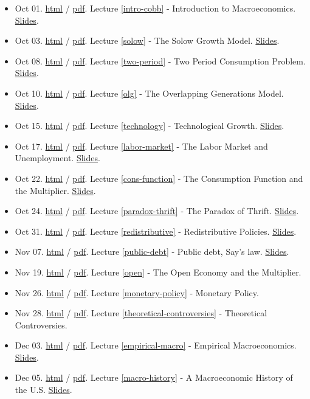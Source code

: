 \documentclass[]{book}
\providecommand{\tightlist}{%
  \setlength{\itemsep}{0pt}\setlength{\parskip}{0pt}}
\begin{document}
\begin{itemize}
\tightlist
\item
  Oct 01. \href{intro-cobb.html}{html} / \href{intro-cobb.pdf}{pdf}.
  Lecture \ref{intro-cobb} - Introduction to Macroeconomics.
  \href{slides/lecture1-slides.pdf}{Slides}.
\item
  Oct 03. \href{solow.html}{html} / \href{solow.pdf}{pdf}. Lecture
  \ref{solow} - The Solow Growth Model.
  \href{slides/lecture2-slides.pdf}{Slides}.
\item
  Oct 08. \href{two-period.html}{html} / \href{two-period.pdf}{pdf}.
  Lecture \ref{two-period} - Two Period Consumption Problem.
  \href{slides/lecture3-slides.pdf}{Slides}.
\item
  Oct 10. \href{olg.html}{html} / \href{olg.pdf}{pdf}. Lecture \ref{olg}
  - The Overlapping Generations Model.
  \href{slides/lecture4-slides.pdf}{Slides}.
\item
  Oct 15. \href{technology.html}{html} / \href{technology.pdf}{pdf}.
  Lecture \ref{technology} - Technological Growth.
  \href{slides/lecture5-slides.pdf}{Slides}.
\item
  Oct 17. \href{labor-market.html}{html} / \href{labor-market.pdf}{pdf}.
  Lecture \ref{labor-market} - The Labor Market and Unemployment.
  \href{slides/lecture6-slides.pdf}{Slides}.
\item
  Oct 22. \href{cons-function.html}{html} /
  \href{cons-function.pdf}{pdf}. Lecture \ref{cons-function} - The
  Consumption Function and the Multiplier.
  \href{slides/lecture7-slides.pdf}{Slides}.
\item
  Oct 24. \href{paradox-thrift.html}{html} /
  \href{paradox-thrift.pdf}{pdf}. Lecture \ref{paradox-thrift} - The
  Paradox of Thrift. \href{slides/lecture8-slides.pdf}{Slides}.
\item
  Oct 31. \href{redistributive.html}{html} /
  \href{redistributive.pdf}{pdf}. Lecture \ref{redistributive} -
  Redistributive Policies. \href{slides/lecture9-slides.pdf}{Slides}.
\item
  Nov 07. \href{public-debt.html}{html} / \href{public-debt.pdf}{pdf}.
  Lecture \ref{public-debt} - Public debt, Say's law.
  \href{slides/lecture10-slides.pdf}{Slides}.
\item
  Nov 19. \href{open.html}{html} / \href{open.pdf}{pdf}. Lecture
  \ref{open} - The Open Economy and the Multiplier.
\item
  Nov 26. \href{monetary-policy.html}{html} /
  \href{monetary-policy.pdf}{pdf}. Lecture \ref{monetary-policy} -
  Monetary Policy.
\item
  Nov 28. \href{theoretical-controversies.html}{html} /
  \href{theoretical-controversies.pdf}{pdf}. Lecture
  \ref{theoretical-controversies} - Theoretical Controversies.
\item
  Dec 03. \href{empirical-macro.html}{html} /
  \href{empirical-macro.pdf}{pdf}. Lecture \ref{empirical-macro} -
  Empirical Macroeconomics. \href{slides/lecture14-slides.pdf}{Slides}.
\item
  Dec 05. \href{macro-history.html}{html} /
  \href{macro-history.pdf}{pdf}. Lecture \ref{macro-history} - A
  Macroeconomic History of the U.S.
  \href{slides/lecture15-slides.pdf}{Slides}.
\end{itemize}
\end{document}

